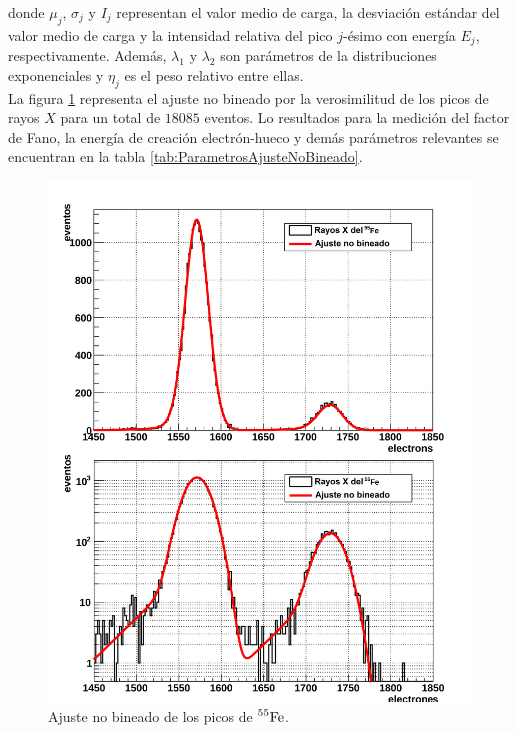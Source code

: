 donde $\mu_{j}$, $\sigma_{j}$ y $I_{j}$ representan el valor medio de carga, la desviación estándar del valor medio de carga y la intensidad relativa del pico $j$-ésimo con energía $E_{j}$, respectivamente. Además, $\lambda_{1}$ y $\lambda_{2}$ son parámetros de la distribuciones exponenciales y $\eta_{j}$ es el peso relativo entre ellas.\\
\indent La figura \ref{fig:AjusteNoBineado} representa el ajuste no bineado por la verosimilitud de los picos de rayos $X$ para un total de $18085$ eventos. Lo resultados para la medición del factor de Fano, la energía de creación electrón-hueco y demás parámetros relevantes se encuentran en la tabla \ref{tab:ParametrosAjusteNoBineado}.
\begin{figure}%
    \centering
        \includegraphics[scale=.15]{Figs/AjusteNoBineado.png}
    \caption{\footnotesize{Ajuste no bineado de los picos de $\prescript{55}{}{\mbox{Fe}}$.}}
    \label{fig:AjusteNoBineado}
\end{figure}
